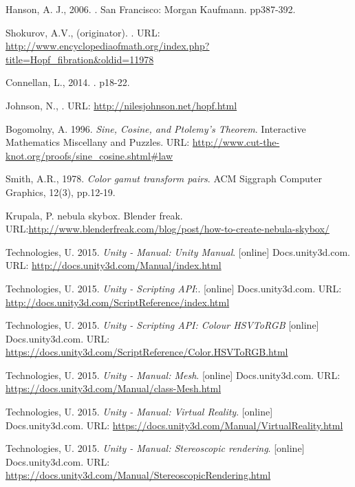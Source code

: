 \documentclass[12pt]{article} %
\begin{document}
\begin{flushleft}
\begin{thebibliography}{99}
Hanson, A. J., 2006.
.
 San Francisco: Morgan Kaufmann. pp387-392.

Shokurov, A.V., (originator).
. URL: \url{http://www.encyclopediaofmath.org/index.php?title=Hopf\_fibration\&oldid=11978}

Connellan, L., 2014.
. p18-22.

Johnson, N., 
. 
\newblock URL:
\newblock \url{http://nilesjohnson.net/hopf.html}

Bogomolny, A. 1996. {\em Sine, Cosine, and Ptolemy's Theorem}. Interactive Mathematics Miscellany and Puzzles. URL: \url{http://www.cut-the-knot.org/proofs/sine_cosine.shtml#law}

Smith, A.R., 1978. {\em Color gamut transform pairs}. ACM Siggraph Computer Graphics, 12(3), pp.12-19.

Krupala, P. nebula skybox. Blender freak. URL:\url{http://www.blenderfreak.com/blog/post/how-to-create-nebula-skybox/}

Technologies, U. 2015. {\em Unity - Manual: Unity Manual}. [online] Docs.unity3d.com. URL: \url{http://docs.unity3d.com/Manual/index.html}

Technologies, U. 2015. {\em Unity - Scripting API}:. [online] Docs.unity3d.com. URL: \url{http://docs.unity3d.com/ScriptReference/index.html}

Technologies, U. 2015. {\em Unity - Scripting API: Colour HSVToRGB} [online] Docs.unity3d.com. URL: \url{https://docs.unity3d.com/ScriptReference/Color.HSVToRGB.html}

Technologies, U. 2015. {\em Unity - Manual: Mesh}. [online] Docs.unity3d.com. URL: \url{https://docs.unity3d.com/Manual/class-Mesh.html}

Technologies, U. 2015. {\em Unity - Manual: Virtual Reality}. [online] Docs.unity3d.com. URL: \url{https://docs.unity3d.com/Manual/VirtualReality.html}

Technologies, U. 2015. {\em Unity - Manual: Stereoscopic rendering}. [online] Docs.unity3d.com. URL: \url{https://docs.unity3d.com/Manual/StereoscopicRendering.html}


\end{thebibliography}
\end{flushleft}
\end{document}
